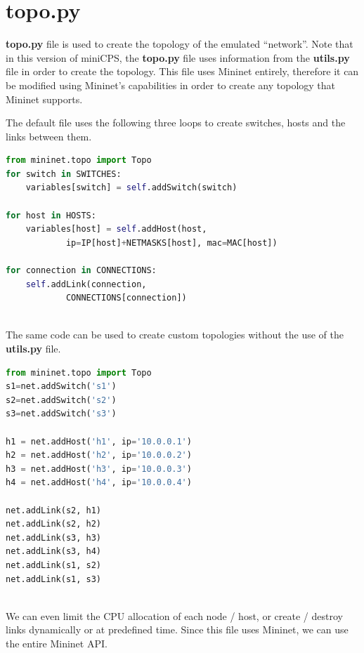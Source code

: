 \documentclass[book,a4paper,12pt,oneside]{memoir}
\begin{document}
\newpage
\section{topo.py}
\label{cha:basicuse-sec:topo}
\textbf{topo.py} file is used to create the topology of the emulated ``network''.  Note that in this version of miniCPS, the \textbf{topo.py} file uses information from the \textbf{utils.py} file in order to create the topology.  This file uses Mininet entirely, therefore it can be modified using Mininet's capabilities in order to create any topology that Mininet supports.

\noindent The default file uses the following three loops to create switches, hosts and the links between them.

\begin{lstlisting}[backgroundcolor = \color{ultralightgray}, language = Python, xleftmargin = 0.1cm, framexleftmargin = 0.3em, showstringspaces=false]
from mininet.topo import Topo
for switch in SWITCHES:
    variables[switch] = self.addSwitch(switch)

for host in HOSTS:
    variables[host] = self.addHost(host, 
            ip=IP[host]+NETMASKS[host], mac=MAC[host])

for connection in CONNECTIONS:
    self.addLink(connection, 
            CONNECTIONS[connection])
\end{lstlisting}


\noindent \\ The same code can be used to create custom topologies without the use of the \textbf{utils.py} file.

\begin{lstlisting}[backgroundcolor = \color{ultralightgray}, language = Python, xleftmargin = 0.1cm, framexleftmargin = 0.3em, showstringspaces=false]
from mininet.topo import Topo
s1=net.addSwitch('s1')
s2=net.addSwitch('s2')
s3=net.addSwitch('s3')

h1 = net.addHost('h1', ip='10.0.0.1')
h2 = net.addHost('h2', ip='10.0.0.2')
h3 = net.addHost('h3', ip='10.0.0.3')
h4 = net.addHost('h4', ip='10.0.0.4')

net.addLink(s2, h1)
net.addLink(s2, h2)
net.addLink(s3, h3)
net.addLink(s3, h4)
net.addLink(s1, s2)
net.addLink(s1, s3)
\end{lstlisting}


\noindent \\ We can even limit the CPU allocation of each node / host, or create / destroy links dynamically or at predefined time.  Since this file uses Mininet, we can use the entire Mininet API. 
\end{document}

